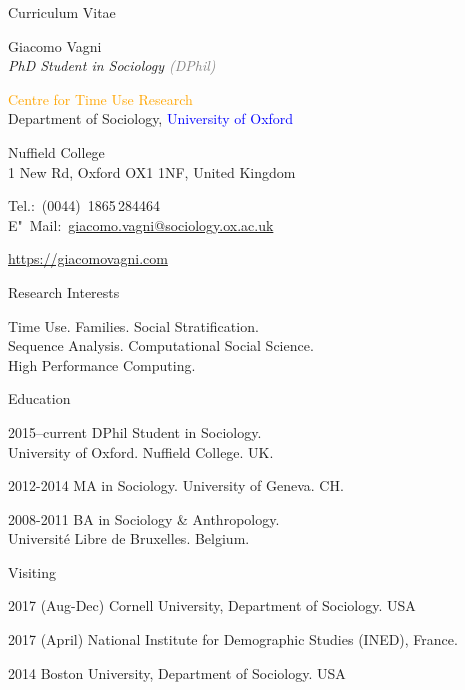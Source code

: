 \documentclass[10pt,a4paper]{article}
\begin{document}
\begin{cv}{Curriculum Vitae}
  \begin{cvlist}{}
  \item \colorbox{mygray} {Giacomo Vagni}\\
  \emph{PhD Student in Sociology \textcolor{Gray}{(DPhil)}}
  
    \textcolor{Orange} {Centre for Time Use Research} \\
     Department of Sociology, \textcolor{Blue}{University of Oxford} 
    \item Nuffield College \\ 
    1 New Rd, Oxford OX1 1NF, United Kingdom
  \item Tel.:~(0044)~1865\,284464\\
    E"~Mail:~\href{mailto:giacomo.vagni@sociology.ox.ac.uk}{giacomo.vagni@sociology.ox.ac.uk}
    
    \item \href{https://giacomovagni.com} {https://giacomovagni.com} \\
    
  \end{cvlist}
  
  \begin{cvlist}{Research Interests}
  \item[] Time Use. Families. Social Stratification. \\  Sequence Analysis. Computational Social Science. \\ High Performance Computing. 
  \end{cvlist}
  
  \begin{cvlist}{Education}
  \item[2015--current] DPhil Student in Sociology. \\ University of Oxford. Nuffield College. UK. 
  \item[2012-2014] MA in Sociology. University of Geneva. CH. 
  \item[2008-2011] BA in Sociology \& Anthropology. \\ Universit{\'e} Libre de Bruxelles. Belgium. 
  \end{cvlist}
  
      \begin{cvlist}{Visiting}
      	\item[2017 (Aug-Dec)] Cornell University, Department of Sociology. USA 
      	\item[2017 (April)] National Institute for Demographic Studies (INED), France. 
      	\item[2014] Boston University, Department of Sociology. USA
      \end{cvlist}
      

\end{cv}
\end{document}
